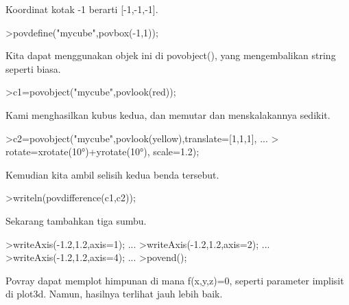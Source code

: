 \documentclass[a4paper,10pt]{article}
\begin{document}
\begin{eulernotebook}
\begin{eulercomment}
\begin{eulercomment}
\begin{eulercomment}
\begin{eulercomment}
\begin{eulercomment}
\begin{eulercomment}
\begin{eulercomment}
\begin{eulercomment}
\begin{eulercomment}
\begin{eulercomment}
\begin{eulercomment}
Koordinat kotak -1 berarti [-1,-1,-1].
\end{eulercomment}
\begin{eulerprompt}
>povdefine("mycube",povbox(-1,1));
\end{eulerprompt}
\begin{eulercomment}
Kita dapat menggunakan objek ini di povobject(), yang mengembalikan
string seperti biasa.
\end{eulercomment}
\begin{eulerprompt}
>c1=povobject("mycube",povlook(red));
\end{eulerprompt}
\begin{eulercomment}
Kami menghasilkan kubus kedua, dan memutar dan menskalakannya sedikit.
\end{eulercomment}
\begin{eulerprompt}
>c2=povobject("mycube",povlook(yellow),translate=[1,1,1], ...
>  rotate=xrotate(10°)+yrotate(10°), scale=1.2);
\end{eulerprompt}
\begin{eulercomment}
Kemudian kita ambil selisih kedua benda tersebut.
\end{eulercomment}
\begin{eulerprompt}
>writeln(povdifference(c1,c2));
\end{eulerprompt}
\begin{eulercomment}
Sekarang tambahkan tiga sumbu.
\end{eulercomment}
\begin{eulerprompt}
>writeAxis(-1.2,1.2,axis=1); ...
>writeAxis(-1.2,1.2,axis=2); ...
>writeAxis(-1.2,1.2,axis=4); ...
>povend();
\end{eulerprompt}
\begin{eulercomment}
Povray dapat memplot himpunan di mana f(x,y,z)=0, seperti parameter
implisit di plot3d. Namun, hasilnya terlihat jauh lebih baik.


\end{eulercomment}
\end{eulercomment}
\end{eulercomment}
\end{eulercomment}
\end{eulercomment}
\end{eulercomment}
\end{eulercomment}
\end{eulercomment}
\end{eulercomment}
\end{eulercomment}
\end{eulercomment}
\end{eulernotebook}
\end{document}
